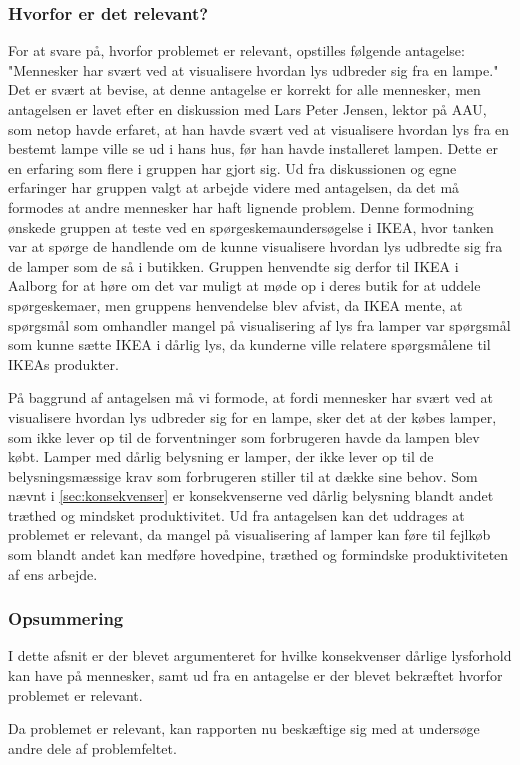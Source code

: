 \subsubsection{Hvorfor er det relevant?}
\label{sec:hvorfor_relavant}
For at svare på, hvorfor problemet er relevant, opstilles følgende antagelse: "Mennesker har svært ved at visualisere hvordan lys udbreder sig fra en lampe." Det er svært at bevise, at denne antagelse er korrekt for alle mennesker, men antagelsen er lavet efter en diskussion med Lars Peter Jensen, lektor på AAU, som netop havde erfaret, at han havde svært ved at visualisere hvordan lys fra en bestemt lampe ville se ud i hans hus, før han havde installeret lampen. Dette er en erfaring som flere i gruppen har gjort sig. Ud fra diskussionen og egne erfaringer har gruppen valgt at arbejde videre med antagelsen, da det må formodes at andre mennesker har haft lignende problem. Denne formodning ønskede gruppen at teste ved en spørgeskemaundersøgelse i IKEA, hvor tanken var at spørge de handlende om de kunne visualisere hvordan lys udbredte sig fra de lamper som de så i butikken. Gruppen henvendte sig derfor til IKEA i Aalborg for at høre om det var muligt at møde op i deres butik for at uddele spørgeskemaer, men gruppens henvendelse blev afvist, da IKEA mente, at spørgsmål som omhandler mangel på visualisering af lys fra lamper var spørgsmål som kunne sætte IKEA i dårlig lys, da kunderne ville relatere spørgsmålene til IKEAs produkter. 

På baggrund af antagelsen må vi formode, at fordi mennesker har svært ved at visualisere hvordan lys udbreder sig for en lampe, sker det at der købes lamper, som ikke lever op til de forventninger som forbrugeren havde da lampen blev købt. Lamper med dårlig belysning er lamper, der ikke lever op til de belysningsmæssige krav som forbrugeren stiller til at dække sine behov. Som nævnt i \ref{sec:konsekvenser} er konsekvenserne ved dårlig belysning blandt andet træthed og mindsket produktivitet.
Ud fra antagelsen kan det uddrages at problemet er relevant, da mangel på visualisering af lamper kan føre til fejlkøb som blandt andet kan medføre hovedpine, træthed og formindske produktiviteten af ens arbejde.

\subsubsection*{Opsummering}
I dette afsnit er der blevet argumenteret for hvilke konsekvenser dårlige lysforhold kan have på mennesker, samt ud fra en antagelse er der blevet bekræftet hvorfor problemet er relevant. 

Da problemet er relevant, kan rapporten nu beskæftige sig med at undersøge andre dele af problemfeltet. 
